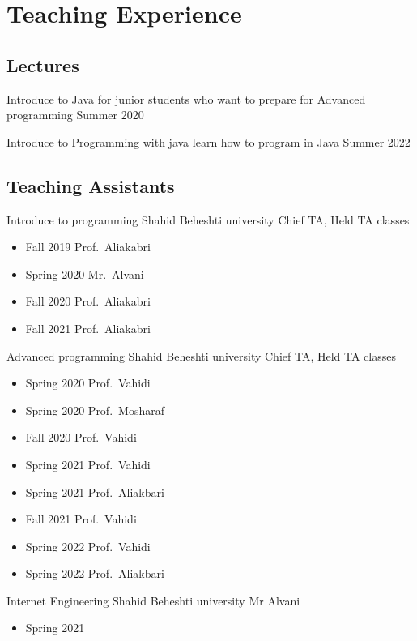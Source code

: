 \section{Teaching Experience}

\subsection{Lectures}
\cventry{}
  {Introduce to Java}
  {for junior students who want to prepare for Advanced programming}
  {}
  {}
  {Summer 2020}

\cventry{}
  {Introduce to Programming with java}
  {learn how to program in Java}
  {}
  {}
  {Summer 2022}

\subsection{Teaching Assistants}

\cventry{}
  {Introduce to programming}
  {}
  {Shahid Beheshti university}
  {Chief TA, Held TA classes}
  {%
    \begin{itemize}
      \item Fall 2019 Prof.\ Aliakabri
      \item Spring 2020 Mr.\ Alvani
      \item Fall 2020 Prof.\ Aliakabri
      \item Fall 2021 Prof.\ Aliakabri
    \end{itemize}
 }
\cventry{}
  {Advanced programming}
  {}
  {Shahid Beheshti university}
  {Chief TA, Held TA classes}
  {%
    \begin{itemize}
      \item Spring 2020 Prof.\ Vahidi
      \item Spring 2020 Prof.\ Mosharaf
      \item Fall 2020 Prof.\ Vahidi
      \item Spring 2021 Prof.\ Vahidi
      \item Spring 2021 Prof.\ Aliakbari
      \item Fall 2021 Prof.\ Vahidi
      \item Spring 2022 Prof.\ Vahidi
      \item Spring 2022 Prof.\ Aliakbari
    \end{itemize}
 }

\cventry{}
  {Internet Engineering}
  {}
  {Shahid Beheshti university}
  {Mr Alvani}
  {%
    \begin{itemize}
      \item Spring 2021
    \end{itemize}
   }


